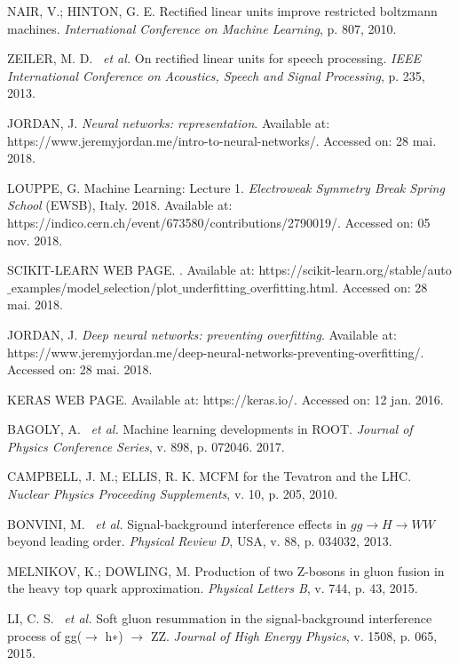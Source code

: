 \begin{thebibliography}{}
NAIR, V.; HINTON, G. E. Rectified  linear  units  improve restricted  boltzmann machines. \textit{International Conference on Machine Learning}, p. 807, 2010.

ZEILER, M. D. ~\textit{et al.} On rectified linear units for speech processing. \textit{IEEE International Conference on Acoustics, Speech and Signal Processing}, p. 235, 2013.

JORDAN, J. \textit{Neural networks: representation}. Available at: https://www.jeremyjordan.me/intro-to-neural-networks/. Accessed on: 28 mai. 2018.

LOUPPE, G. Machine Learning: Lecture 1. \textit{Electroweak Symmetry Break Spring School} (EWSB), Italy.
2018. Available at: https://indico.cern.ch/event/673580/contributions/2790019/. Accessed on: 05 nov. 2018.

SCIKIT-LEARN WEB PAGE. . Available at: https://scikit-learn.org/stable/auto$\_$examples/model$\_$selection/plot$\_$underfitting$\_$overfitting.html. Accessed on: 28 mai. 2018.

JORDAN, J. \textit{Deep neural networks: preventing overfitting}. Available at: https://www.jeremyjordan.me/deep-neural-networks-preventing-overfitting/. Accessed on: 28 mai. 2018.

KERAS WEB PAGE. Available at: https://keras.io/. Accessed on: 12 jan. 2016.

BAGOLY, A. ~\textit{et al.} Machine learning developments in ROOT. \textit{Journal of Physics Conference Series}, v. 898, p. 072046. 2017.

CAMPBELL, J. M.; ELLIS, R. K. MCFM for the Tevatron and the LHC. \textit{Nuclear Physics Proceeding Supplements}, v. 10, p. 205, 2010.

BONVINI, M. ~\textit{et al.} Signal-background interference effects in $gg \rightarrow H \rightarrow WW$ beyond leading order. \textit{Physical Review D}, USA, v. 88, p. 034032, 2013.

MELNIKOV, K.; DOWLING, M. Production of two Z-bosons in gluon fusion in the heavy top quark approximation. \textit{Physical Letters B}, v. 744, p. 43, 2015.

LI, C. S. ~\textit{et al.} Soft gluon resummation in the signal-background interference process of gg($\rightarrow$ h∗) $\rightarrow$ ZZ. \textit{Journal of High Energy Physics}, v. 1508, p. 065, 2015.


\end{thebibliography}
